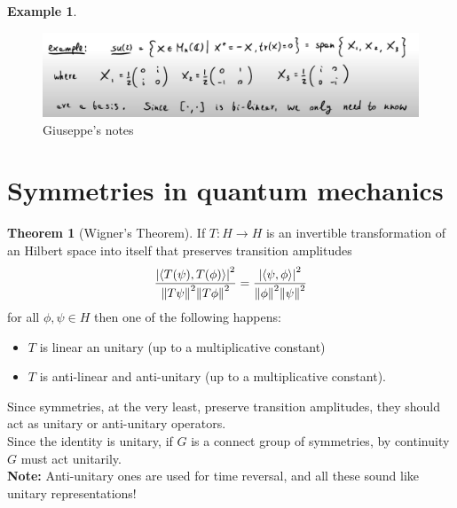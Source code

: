 \documentclass{book}
\theoremstyle{definition}
\newtheorem{thm}{Theorem}[section]
\newtheorem{exmp}{Example}[section]
\newcommand{\f}[2]{\frac{#1}{#2}}
\newcommand{\la}{\langle}
\newcommand{\ra}{\rangle}
\begin{document}
\newpage
\begin{exmp}
	
	\begin{figure}[!htb]
		\centering
		\includegraphics[scale=0.3]{lie5}
		\caption{Giuseppe's notes}
	\end{figure}
\end{exmp}










\newpage
\section{Symmetries in quantum mechanics}


\begin{thm}[Wigner's Theorem]  If $T : H \to H$ is an invertible transformation of an Hilbert space into itself that preserves transition amplitudes
\begin{align}
\f{\abs{\la T(\psi),  T(\phi) \ra }^2}{\norm{T\psi}^2\norm{T\phi}^2} = \f{\abs{\la \psi,\phi \ra}^2}{\norm{\phi}^2 \norm{\psi}^2}
\end{align}	
for all $\phi,\psi \in H$ then one of the following happens:
\begin{itemize}
	\item $T$ is linear an unitary (up to a multiplicative constant)
	\item $T$ is anti-linear and anti-unitary (up to a multiplicative constant).
\end{itemize}
	
	
\end{thm}


Since symmetries, at the very least, preserve transition amplitudes, they should act as unitary or anti-unitary operators. \\

Since the identity is unitary, if $G$ is a connect group of symmetries, by continuity $G$ must act unitarily. \\

\textbf{Note:} Anti-unitary ones are used for time reversal, and all these sound like unitary representations!\\
\end{document}
